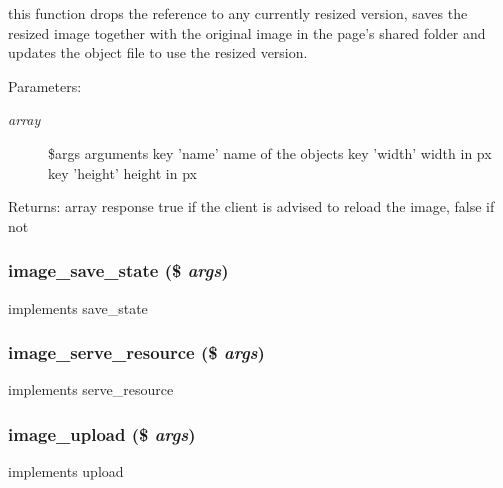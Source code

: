 this function drops the reference to any currently resized version, saves the resized image together with the original image in the page's shared folder and updates the object file to use the resized version. \begin{Desc}
\item[Parameters:]
\begin{description}
\item[{\em array}]\$args arguments key 'name' name of the objects key 'width' width in px key 'height' height in px \end{description}
\end{Desc}
\begin{Desc}
\item[Returns:]array response true if the client is advised to reload the image, false if not \end{Desc}
\hypertarget{module__image_8inc_8php_c26ea1448f0b7ed835907cf7c22b60ca}{
\subsubsection[{image\_\-save\_\-state}]{\setlength{\rightskip}{0pt plus 5cm}image\_\-save\_\-state (\$ {\em args})}}
\label{module__image_8inc_8php_c26ea1448f0b7ed835907cf7c22b60ca}


implements save\_\-state \hypertarget{module__image_8inc_8php_bb6646bfaa6a012e620cdaaa0bc3c807}{
\subsubsection[{image\_\-serve\_\-resource}]{\setlength{\rightskip}{0pt plus 5cm}image\_\-serve\_\-resource (\$ {\em args})}}
\label{module__image_8inc_8php_bb6646bfaa6a012e620cdaaa0bc3c807}


implements serve\_\-resource \hypertarget{module__image_8inc_8php_37dee9de60e2852c0631d8e60e58585c}{
\subsubsection[{image\_\-upload}]{\setlength{\rightskip}{0pt plus 5cm}image\_\-upload (\$ {\em args})}}
\label{module__image_8inc_8php_37dee9de60e2852c0631d8e60e58585c}


implements upload 